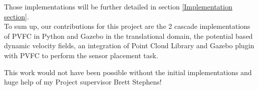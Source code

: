 Those implementations will be further detailed in section \ref{Implementation section}.\\
To sum up, our contributions for this project are the 2 cascade implementations of PVFC in Python and Gazebo in the translational domain, the potential based dynamic velocity fields, an integration of Point Cloud Library and Gazebo plugin with PVFC to perform the sensor placement task.

This work would not have been possible without the initial implementations and huge help of my Project supervisor Brett Stephens! 

